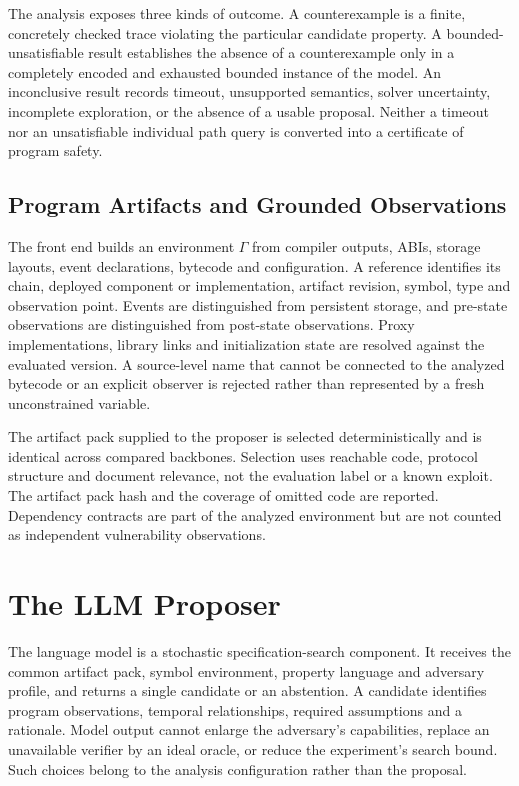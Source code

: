 \documentclass[journal]{IEEEtran}
\theoremstyle{definition}
\begin{document}
The analysis exposes three kinds of outcome. A counterexample is a finite, concretely checked trace violating the particular candidate property. A bounded-unsatisfiable result establishes the absence of a counterexample only in a completely encoded and exhausted bounded instance of the model. An inconclusive result records timeout, unsupported semantics, solver uncertainty, incomplete exploration, or the absence of a usable proposal. Neither a timeout nor an unsatisfiable individual path query is converted into a certificate of program safety.

\subsection{Program Artifacts and Grounded Observations}

The front end builds an environment $\Gamma$ from compiler outputs, ABIs, storage layouts, event declarations, bytecode and configuration. A reference identifies its chain, deployed component or implementation, artifact revision, symbol, type and observation point. Events are distinguished from persistent storage, and pre-state observations are distinguished from post-state observations. Proxy implementations, library links and initialization state are resolved against the evaluated version. A source-level name that cannot be connected to the analyzed bytecode or an explicit observer is rejected rather than represented by a fresh unconstrained variable.

The artifact pack supplied to the proposer is selected deterministically and is identical across compared backbones. Selection uses reachable code, protocol structure and document relevance, not the evaluation label or a known exploit. The artifact pack hash and the coverage of omitted code are reported. Dependency contracts are part of the analyzed environment but are not counted as independent vulnerability observations.

\section{The LLM Proposer}
\label{sec:proposer-v2}

The language model is a stochastic specification-search component. It receives the common artifact pack, symbol environment, property language and adversary profile, and returns a single candidate or an abstention. A candidate identifies program observations, temporal relationships, required assumptions and a rationale. Model output cannot enlarge the adversary's capabilities, replace an unavailable verifier by an ideal oracle, or reduce the experiment's search bound. Such choices belong to the analysis configuration rather than the proposal.
\end{document}
